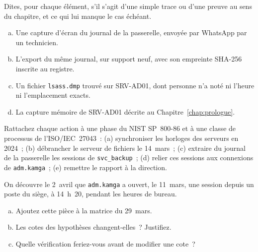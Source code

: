 \begin{boxexo}[title={\ding{45}\quad Exercice~1.1. Trace ou preuve \niveaubase}]
Dites, pour chaque élément, s'il s'agit d'une simple trace ou d'une preuve
au sens du chapitre, et ce qui lui manque le cas échéant.
\begin{enumerate}[(a)]
    \item Une capture d'écran du journal de la passerelle, envoyée par
          WhatsApp par un technicien.
    \item L'export du même journal, sur support neuf, avec son empreinte
          SHA-256 inscrite au registre.
    \item Un fichier \texttt{lsass.dmp} trouvé sur SRV-AD01, dont personne
          n'a noté ni l'heure ni l'emplacement exacts.
    \item La capture mémoire de SRV-AD01 décrite au Chapitre~\ref{chap:prologue}.
\end{enumerate}
\end{boxexo}

\begin{boxexo}[title={\ding{45}\quad Exercice~1.2. Les phases et les classes \niveaubase}]
Rattachez chaque action à une phase du NIST SP~800-86 et à une classe de
processus de l'ISO/IEC~27043~: (a) synchroniser les horloges des serveurs
en 2024~; (b) débrancher le serveur de fichiers le 14~mars~; (c) extraire
du journal de la passerelle les sessions de \texttt{svc\_backup}~; (d)
relier ces sessions aux connexions de \texttt{adm.kamga}~; (e) remettre le
rapport à la direction.
\end{boxexo}

\begin{boxexo}[title={\ding{45}\quad Exercice~1.3. Une pièce qui change tout \niveaumoyen}]
On découvre le 2~avril que \texttt{adm.kamga} a ouvert, le 11~mars, une
session depuis un poste du siège, à 14~h~20, pendant les heures de bureau.
\begin{enumerate}[(a)]
    \item Ajoutez cette pièce à la matrice du 29~mars.
    \item Les cotes des hypothèses changent-elles~? Justifiez.
    \item Quelle vérification feriez-vous avant de modifier une cote~?
\end{enumerate}
\end{boxexo}


